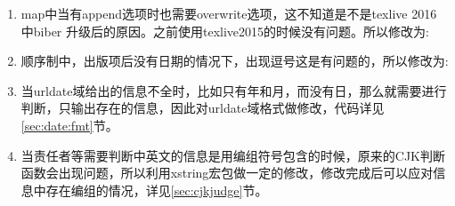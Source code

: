 \begin{enumerate}
\item map中当有append选项时也需要overwrite选项，这不知道是不是texlive 2016 中biber 升级后的原因。之前使用texlive2015的时候没有问题。所以修改为:
\begin{texlist}
        \map{%
            \step[fieldsource=entrykey]
            \step[fieldset=keywords, origfieldval]
            }
        \map[overwrite]{%
            \step[fieldsource=note, final]%
            \step[fieldset=keywords, fieldvalue={,}, append]
            \step[fieldset=keywords, origfieldval, append]
            }
\end{texlist}

\item 顺序制中，出版项后没有日期的情况下，出现逗号这是有问题的，所以修改为:
\begin{texlist}
\end{texlist}

\item 当urldate域给出的信息不全时，比如只有年和月，而没有日，那么就需要进行判断，只输出存在的信息，因此对urldate域格式做修改，代码详见\ref{sec:date:fmt}节。


\item 当责任者等需要判断中英文的信息是用编组符号包含的时候，原来的CJK判断函数会出现问题，所以利用xstring宏包做一定的修改，修改完成后可以应对信息中存在编组的情况，详见\ref{sec:cjkjudge}节。
\end{enumerate}

